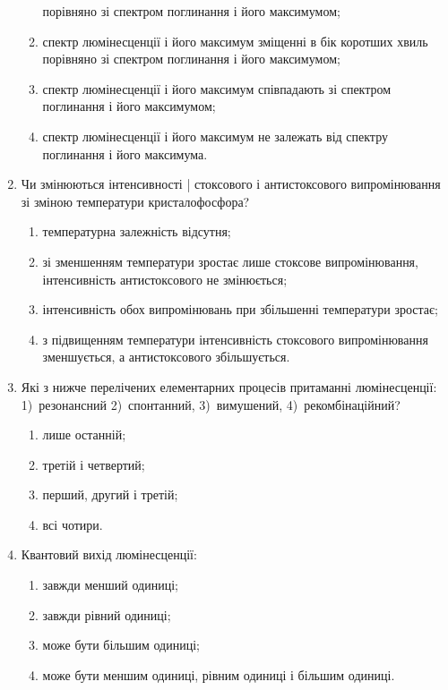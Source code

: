 \documentclass[twocolumn]{el-author}
\begin{document}
\begin{enumerate}
\begin{enumerate}
порівняно зі спектром поглинання і його максимумом;
		\item спектр люмінесценції і його максимум зміщенні в бік коротших хвиль
порівняно зі спектром поглинання і його максимумом;
		\item спектр люмінесценції і його максимум співпадають зі спектром
поглинання і його максимумом;
		\item спектр люмінесценції і його максимум не залежать від спектру
поглинання і його максимума.
	\end{enumerate}
	\item Чи змінюються інтенсивності | стоксового і  антистоксового
випромінювання зі зміною температури кристалофосфора?
	\begin{enumerate}
		\item температурна залежність відсутня;
		\item зі зменшенням температури зростає лише стоксове випромінювання,
		інтенсивність антистоксового не змінюється;
		\item інтенсивність обох випромінювань при збільшенні температури зростає;
		\item з підвищенням температури інтенсивність стоксового випромінювання
зменшується, а антистоксового збільшується.
	\end{enumerate}
	\item Які з нижче перелічених елементарних процесів притаманні
	люмінесценції: 1)~резонансний 2)~спонтанний, 3)~вимушений,
4)~рекомбінаційний?
	\begin{enumerate}
		\item лише останній;
		\item третій і четвертий;
		\item перший, другий і третій;
		\item всі чотири.
	\end{enumerate}
	\item Квантовий вихід люмінесценції:
	\begin{enumerate}
		\item завжди менший одиниці;
		\item завжди рівний одиниці;
		\item може бути більшим одиниці;
		\item може бути меншим одиниці, рівним одиниці і більшим одиниці.
	\end{enumerate}
\end{enumerate}
\end{document}
